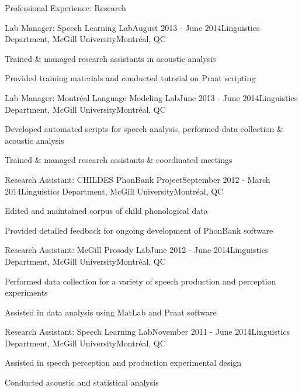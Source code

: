 \documentclass{resume} %
\begin{document}
\begin{rSection}{Professional Experience: Research}
	
	\begin{rSubsection}{Lab Manager: Speech Learning Lab}{August 2013 - June 2014}{Linguistics Department, McGill University}{Montr\'eal, QC}
	\item Trained \& managed research assistants in acoustic analysis
	\item Provided training materials and conducted tutorial on Praat scripting
	\end{rSubsection}
	
	
	\begin{rSubsection}{Lab Manager: Montr\'eal Language Modeling Lab}{June 2013 - June 2014}{Linguistics Department, McGill University}{Montr\'eal, QC}
	\item Developed automated scripts for speech analysis, performed data collection \& acoustic analysis
	\item Trained \& managed research assistants \& coordinated meetings
	\end{rSubsection}
	
	
	\begin{rSubsection}{Research Assistant: CHILDES PhonBank Project}{September 2012 - March 2014}{Linguistics Department, McGill University}{Montr\'eal, QC}
	\item Edited and maintained corpus of child phonological data
	\item Provided detailed feedback for ongoing development of PhonBank software
	\end{rSubsection}
	
	
	\begin{rSubsection}{Research Assistant: McGill Prosody Lab}{June 2012 - June 2014}{Linguistics Department, McGill University}{Montr\'eal, QC}
	\item Performed data collection for a variety of speech production and perception experiments
	\item Assisted in data analysis using MatLab and Praat software
	\end{rSubsection}
	
	
	\begin{rSubsection}{Research Assistant: Speech Learning Lab}{November 2011 - June 2014}{Linguistics Department, McGill University}{Montr\'eal, QC}
	\item Assisted in speech perception and production experimental design
	\item Conducted acoustic and statistical analysis
	\end{rSubsection}

\end{rSection}
\end{document}
